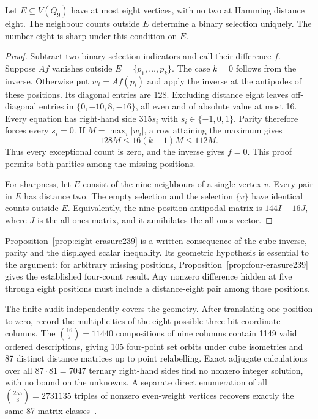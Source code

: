 \begin{proposition}\label{prop:eight-erasure239}
Let $E\subseteq V(Q_9)$ have at most eight vertices, with no two at
Hamming distance eight. The neighbour counts outside $E$ determine a
binary selection uniquely. The number eight is sharp under this
condition on $E$.
\end{proposition}
\begin{proof}
Subtract two binary selection indicators and call their difference
$f$. Suppose $Af$ vanishes outside $E=\{p_1,\ldots,p_k\}$.
The case $k=0$ follows from the inverse. Otherwise put $w_i=Af(p_i)$
and apply the inverse at the antipodes of these positions. Its diagonal
entries are 128. Excluding distance eight leaves off-diagonal entries
in $\{0,-10,8,-16\}$, all even and of absolute value at most 16.
Every equation has right-hand side $315s_i$ with
$s_i\in\{-1,0,1\}$. Parity therefore forces every $s_i=0$.
If $M=\max_i|w_i|$, a row attaining the maximum gives
\[
128M\le16(k-1)M\le112M.
\]
Thus every exceptional count is zero, and the inverse gives $f=0$.
This proof permits both parities among the missing positions.

For sharpness, let $E$ consist of the nine neighbours of a single
vertex $v$. Every pair in $E$ has distance two. The empty selection
and the selection $\{v\}$ have identical counts outside $E$.
Equivalently, the nine-position antipodal matrix is $144I-16J$,
where $J$ is the all-ones matrix, and it annihilates the all-ones vector.
\end{proof}

Proposition~\ref{prop:eight-erasure239} is a written consequence of the
cube inverse, parity and the displayed scalar inequality. Its geometric
hypothesis is essential to the argument: for arbitrary missing
positions, Proposition~\ref{prop:four-erasure239} gives the established
four-count result. Any nonzero difference hidden at five through eight
positions must include a distance-eight pair among those positions.

The finite audit independently covers the geometry. After translating
one position to zero, record the multiplicities of the eight possible
three-bit coordinate columns. The $\binom{16}{7}=11440$ compositions of
nine columns contain 1149 valid ordered descriptions, giving 105
four-point set orbits under cube isometries and 87 distinct distance
matrices up to point relabelling. Exact adjugate calculations over all
$87\cdot81=7047$ ternary right-hand sides find no nonzero integer
solution, with no bound on the unknowns. A separate direct enumeration
of all $\binom{255}{3}=2731135$ triples of nonzero even-weight vertices
recovers exactly the same 87 matrix classes~\cite{research239}.

